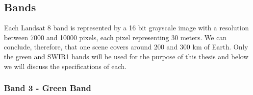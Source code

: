 \documentclass[12pt, a4paper]{report}
\begin{document}
	\subsection{Bands}
	
	\par Each Landsat 8 band is represented by a 16 bit grayscale image with a resolution between 7000 and 10000 pixels, each pixel representing 30 meters. We can conclude, therefore, that one scene covers around 200 and 300 km of Earth. Only the green and SWIR1 bands will be used for the purpose of this thesis and below we will discuss the specifications of each. 
	
	\subsubsection{Band 3 - Green Band}
	
\end{document}

